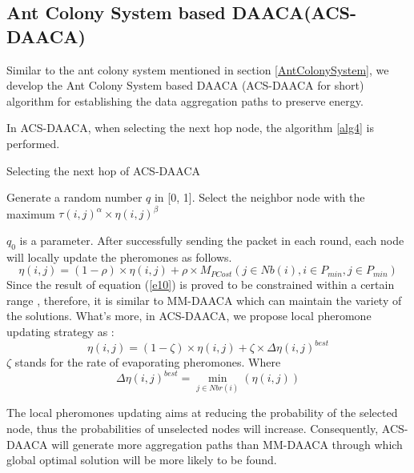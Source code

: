 \documentclass{elsarticle}
\begin{document}
\subsection{Ant Colony System based DAACA(ACS-DAACA)} \label{ACSDAACA}
Similar to the ant colony system mentioned in section \ref{AntColonySystem}, we develop the Ant Colony System based DAACA (ACS-DAACA for short) algorithm for establishing the data aggregation paths to preserve energy.

In ACS-DAACA, when selecting the next hop node, the algorithm \ref{alg4} is performed.
\begin{algorithm}
\caption{Selecting the next hop of ACS-DAACA} \label{alg4}
\begin{algorithmic}[1]
\STATE Generate a random number $q$ in [0, 1].
\STATE Select the neighbor node with the maximum ${\tau(i,j)}^{\alpha} \times {\eta(i,j)}^{\beta}$
\ELSE
{}
\ENDIF
\end{algorithmic}
\end{algorithm}
$q_0$ is a parameter. After successfully sending the packet in each round, each node will locally update the pheromones as follows.
\begin{equation} \label{e10}
\eta(i,j)= (1- \rho) \times \eta(i,j) + \rho \times M_{PCost} (j \in Nb(i), i \in P_{min}, j \in P_{min})
\end{equation}
Since the result of equation (\ref{e10}) is proved to be constrained within a certain range \cite{label-31}, therefore, it is similar to MM-DAACA which can maintain the variety of the solutions. What's more, in ACS-DAACA, we propose local pheromone updating strategy as :
\begin{equation} \label{e11}
\eta(i,j)= (1- \zeta) \times \eta(i,j) + \zeta \times {\Delta\eta(i,j)}^{best}
\end{equation}
$\zeta$ stands for the rate of evaporating pheromones.
Where
\begin{equation}
{\Delta\eta(i,j)}^{best} = \min \limits_{j \in Nbr(i)}({\eta(i,j)})
\end{equation}

The local pheromones updating aims at reducing the probability of the selected node, thus the probabilities of unselected nodes will increase. Consequently, ACS-DAACA will generate more aggregation paths than MM-DAACA through which global optimal solution will be more likely to be found.
\end{document}
